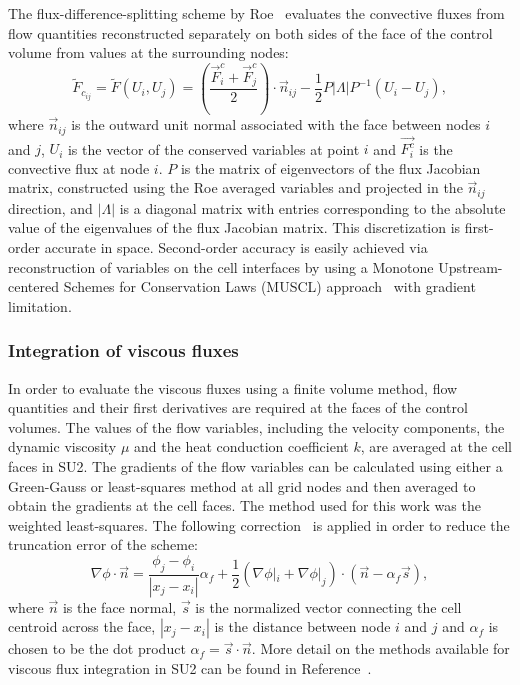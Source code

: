 The flux-difference-splitting scheme by Roe~\cite{roe1981} evaluates the convective fluxes from flow quantities reconstructed separately on both sides of the face of the control volume from values at the surrounding nodes:
\begin{equation} \label{eq:roe}
\tilde{F}_{c_{ij}} = \tilde{F}(U_i, U_j) = \left(\frac{\vec{F}^c_i +\vec{F}^c_j}{2}\right)\cdot \vec{n}_{ij} - \frac{1}{2} P|\Lambda|P^{-1}(U_i - U_j), 
\end{equation}
where $\vec{n}_{ij}$ is the outward unit normal associated with the face between nodes $i$ and $j$, $U_i$ is the vector of the conserved variables at point $i$ and $\vec{F^c_i}$ is the convective flux at node $i$. $P$ is the matrix of eigenvectors of the flux Jacobian matrix, constructed using the Roe averaged variables and projected in the $\vec{n}_{ij}$ direction, and $|\Lambda|$ is a diagonal matrix with entries corresponding to the absolute value of the eigenvalues of the flux Jacobian matrix. This discretization is first-order accurate in space. Second-order accuracy is easily achieved via reconstruction of variables on the cell interfaces by using a Monotone Upstream-centered Schemes for Conservation Laws (MUSCL) approach~\cite{Leer1979} with gradient limitation.


\subsubsection*{Integration of viscous fluxes}

In order to evaluate the viscous fluxes using a finite volume method, flow quantities and their first derivatives are required at the faces of the control volumes. The values of the flow variables, including the velocity components, the dynamic viscosity $\mu$ and the heat conduction coefficient $k$, are averaged at the cell faces in SU2. The gradients of the flow variables can be calculated using either a Green-Gauss or least-squares method at all grid nodes and then averaged to obtain the gradients at the cell faces. The method used for this work was the weighted least-squares. The following correction~\cite{weiss1997} is applied in order to reduce the truncation error of the scheme:
\begin{equation}
\nabla \phi \cdot \vec n = \frac{\phi_{j}-\phi_i}{|x_{j}-x_i|}\alpha_f + \frac{1}{2}(\nabla \phi|_i + \nabla \phi|_j)\cdot(\vec n-\alpha_f \vec s),
\end{equation}
where $\vec {n}$ is the face normal, $\vec s$ is the normalized vector connecting the cell centroid across the face, $|x_{j}-x_i|$ is the distance between node $i$ and $j$ and $\alpha _f$ is chosen to be the dot product $\alpha_f = \vec s\cdot \vec {n}$. More detail on the methods available for viscous flux integration in SU2 can be found in Reference~. 
